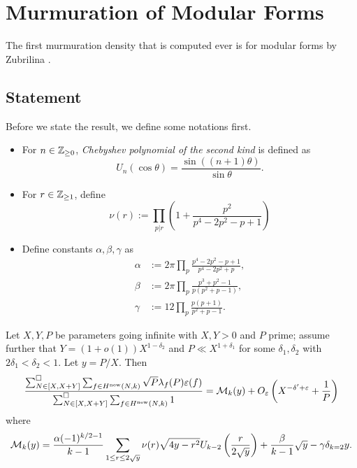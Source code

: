 \section{Murmuration of Modular Forms}
\label{sec:modform}

The first murmuration density that is computed ever is for modular forms by Zubrilina \cite{zubrilina2025murmurations}.

\subsection{Statement}

Before we state the result, we define some notations first.
\begin{itemize}
    \item For $n \in \mathbb{Z}_{\ge 0}$, \emph{Chebyshev polynomial of the second kind} is defined as
    \[
        U_n(\cos \theta) = \frac{\sin((n+1) \theta)}{\sin\theta}. 
    \]
    \item For $r \in \mathbb{Z}_{\ge 1}$, define
    \[
        \nu(r) := \prod_{p | r} \left(1 + \frac{p^2}{p^4 - 2p^2 - p + 1}\right)
    \]
    \item Define constants $\alpha, \beta, \gamma$ as
    \begin{align*}
        \alpha &:= 2\pi \prod_{p} \frac{p^4 - 2p^2 - p + 1}{p^4 - 2p^2 + p}, \\
        \beta &:= 2\pi \prod_{p} \frac{p^3 + p^2 - 1}{p(p^2 + p - 1)}, \\
        \gamma &:= 12 \prod_{p} \frac{p(p + 1)}{p^2 + p - 1}.
    \end{align*}
\end{itemize}
\begin{theorem}
    \label{thm:zubrilina_modform}
    Let $X, Y, P$ be parameters going infinite with $X, Y > 0$ and $P$ prime; assume further that $Y = (1 + o(1))X^{1 - \delta_2}$ and $P \ll X^{1 + \delta_1}$ for some $\delta_1, \delta_2$ with $2\delta_1 < \delta_2 < 1$.
    Let $y = P/X$. Then
    \begin{equation}
        \label{eqn:zubrilina_modform}
        \frac{\sum_{N \in [X, X + Y]}^\square \sum_{f \in H^{\mathrm{new}}(N, k)} \sqrt{P} \lambda_f(P) \varepsilon(f)}{\sum_{N \in  [X, X + Y]}^\square \sum_{f \in H^{\mathrm{new}}(N, k)} 1} = \mathcal{M}_k(y) + O_\varepsilon \left(X^{-\delta' + \varepsilon} + \frac{1}{P}\right)
    \end{equation}
    where
    \begin{equation}
        \mathcal{M}_k(y) = \frac{\alpha(-1)^{k/2 - 1}}{k - 1} \sum_{1 \le r \le 2\sqrt{y}} \nu(r) \sqrt{4y - r^2} U_{k - 2} \left(\frac{r}{2\sqrt{y}}\right) + \frac{\beta}{k-1} \sqrt{y} - \gamma \delta_{k=2} y.
    \end{equation}
\end{theorem}

